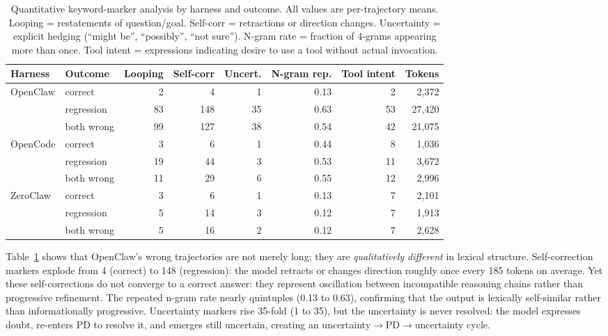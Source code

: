 \begin{table}[t]
\centering
\small
\caption{%
  Quantitative keyword-marker analysis by harness and outcome.
  All values are per-trajectory means.
  Looping = restatements of question/goal.
  Self-corr = retractions or direction changes.
  Uncertainty = explicit hedging (``might be'', ``possibly'', ``not sure'').
  N-gram rate = fraction of 4-grams appearing more than once.
  Tool intent = expressions indicating desire to use a tool without actual
  invocation.
}
\label{tab:gpqa-keyword-failure}
\setlength{\tabcolsep}{3pt}
\begin{tabular}{llrrrrrr}
\toprule
Harness & Outcome & Looping & Self-corr & Uncert. & N-gram rep. & Tool intent & Tokens \\
\midrule
\multirow{3}{*}{OpenClaw}
 & correct   &    2 &    4 &   1 & 0.13 &   2 &  2{,}372 \\
 & regression &   83 &  148 &  35 & 0.63 &  53 & 27{,}420 \\
 & both wrong &   99 &  127 &  38 & 0.54 &  42 & 21{,}075 \\
\midrule
\multirow{3}{*}{OpenCode}
 & correct   &    3 &    6 &   1 & 0.44 &   8 &  1{,}036 \\
 & regression &   19 &   44 &   3 & 0.53 &  11 &  3{,}672 \\
 & both wrong &   11 &   29 &   6 & 0.55 &  12 &  2{,}996 \\
\midrule
\multirow{3}{*}{ZeroClaw}
 & correct   &    3 &    6 &   1 & 0.13 &   7 &  2{,}101 \\
 & regression &    5 &   14 &   3 & 0.12 &   7 &  1{,}913 \\
 & both wrong &    5 &   16 &   2 & 0.12 &   7 &  2{,}628 \\
\bottomrule
\end{tabular}
\end{table}

Table~\ref{tab:gpqa-keyword-failure} shows that OpenClaw's wrong trajectories
are not merely long; they are \emph{qualitatively different} in lexical
structure.
Self-correction markers explode from 4 (correct) to 148 (regression): the model
retracts or changes direction roughly once every 185 tokens on average.
Yet these self-corrections do not converge to a correct answer: they represent
oscillation between incompatible reasoning chains rather than progressive
refinement.
The repeated n-gram rate nearly quintuples (0.13 to 0.63), confirming that the
output is lexically self-similar rather than informationally progressive.
Uncertainty markers rise 35-fold (1 to 35), but the uncertainty is never
resolved: the model expresses doubt, re-enters PD to resolve it, and emerges
still uncertain, creating an uncertainty$\to$PD$\to$uncertainty cycle.

